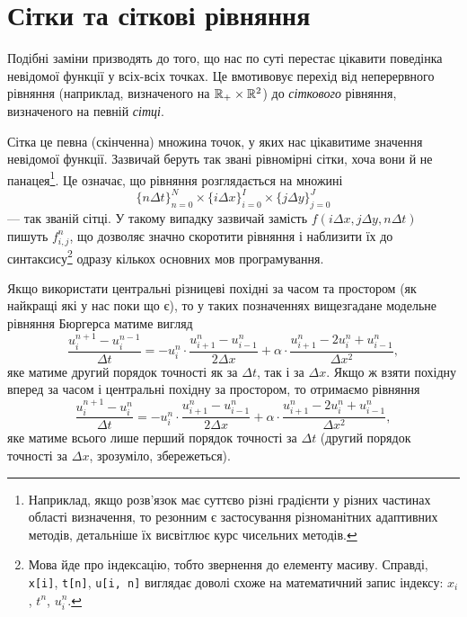 \section{Сітки та сіткові рівняння}

Подібні заміни призводять до того, що нас по суті перестає цікавити поведінка невідомої функції у всіх-всіх точках. %
Це вмотивовує перехід від неперервного рівняння (наприклад, визначеного на $\mathbb{R}_+ \times \mathbb{R}^2$) до \textit{сіткового} рівняння, визначеного на певній \textit{сітці}. \medskip

Сітка це певна (скінченна) множина точок, у яких нас цікавитиме значення невідомої функції. Зазвичай беруть так звані рівномірні сітки, хоча вони й не панацея\footnote{Наприклад, якщо розв'язок має суттєво різні градієнти у різних частинах області визначення, то резонним є застосування різноманітних адаптивних методів, детальніше їх висвітлює курс чисельних методів.}. Це означає, що рівняння розглядається на множині
\begin{equation}
    \{n \Delta t\}_{n = 0}^N \times \{i \Delta x\}_{i = 0}^I \times \{j \Delta y\}_{j = 0}^J
\end{equation} 
--- так званій сітці. У такому випадку зазвичай замість $f(i \Delta x, j \Delta y, n \Delta t)$ пишуть $f_{i, j}^n$, що дозволяє значно скоротити рівняння і наблизити їх до синтаксису\footnote{Мова йде про індексацію, тобто звернення до елементу масиву. Справді, \texttt{x[i]}, \texttt{t[n]}, \texttt{u[i, n]} виглядає доволі схоже на математичний запис індексу: $x_i$, $t^n$, $u_i^n$.} одразу кількох основних мов програмування. \medskip

Якщо використати центральні різницеві похідні за часом та простором (як найкращі які у нас поки що є), то у таких позначеннях вищезгадане модельне рівняння Бюргерса матиме вигляд
\begin{equation}
    \label{eq:burgers-unstable}
    \frac{u_i^{n + 1} - u_i^{n - 1}}{\Delta t} = -u_i^n \cdot \frac{u_{i + 1}^n - u_{i - 1}^n}{2 \Delta x} + \alpha \cdot \frac{u_{i + 1}^n - 2 u_i^n + u_{i - 1}^n}{\Delta x^2},
\end{equation}
яке матиме другий порядок точності як за $\Delta t$, так і за $\Delta x$. Якщо ж взяти похідну вперед за часом і центральні похідну за простором, то отримаємо рівняння
\begin{equation}
    \label{eq:burgers-stable}
    \frac{u_i^{n + 1} - u_i^n}{\Delta t} = -u_i^n \cdot \frac{u_{i + 1}^n - u_{i - 1}^n}{2 \Delta x} + \alpha \cdot \frac{u_{i + 1}^n - 2 u_i^n + u_{i - 1}^n}{\Delta x^2},
\end{equation}
яке матиме всього лише перший порядок точності за $\Delta t$ (другий порядок точності за $\Delta x$, зрозуміло, збережеться). \medskip

